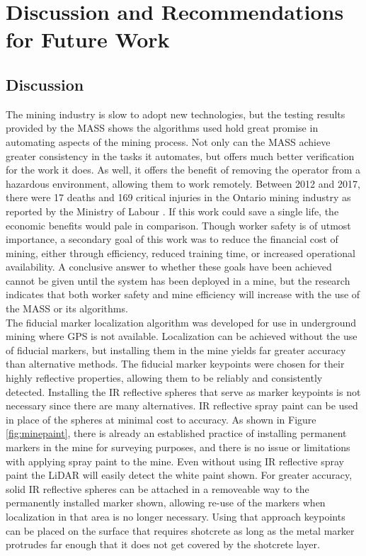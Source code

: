 \chapter{Discussion and Recommendations for Future Work}
\label{chap:conclusions}
\section{Discussion}
The mining industry is slow to adopt new technologies, but the testing results provided by the MASS shows the algorithms used hold great promise in automating aspects of the mining process. Not only can the MASS achieve greater consistency in the tasks it automates, but offers much better verification for the work it does. As well, it offers the benefit of removing the operator from a hazardous environment, allowing them to work remotely. Between 2012 and 2017, there were 17 deaths and 169 critical injuries in the Ontario mining industry as reported by the Ministry of Labour \cite{seebelow}. If this work could save a single life, the economic benefits would pale in comparison. Though worker safety is of utmost importance, a secondary goal of this work was to reduce the financial cost of mining, either through efficiency, reduced training time, or increased operational availability. A conclusive answer to whether these goals have been achieved cannot be given until the system has been deployed in a mine, but the research indicates that both worker safety and mine efficiency will increase with the use of the MASS or its algorithms.\\

The fiducial marker localization algorithm was developed for use in underground mining where GPS is not available. Localization can be achieved without the use of fiducial markers, but installing them in the mine yields far greater accuracy than alternative methods. The fiducial marker keypoints were chosen for their highly reflective properties, allowing them to be reliably and consistently detected. Installing the IR reflective spheres that serve as marker keypoints is not necessary since there are many alternatives. IR reflective spray paint can be used in place of the spheres at minimal cost to accuracy. As shown in Figure \ref{fig:minepaint}, there is already an established practice of installing permanent markers in the mine for surveying purposes, and there is no issue or limitations with applying spray paint to the mine. Even without using IR reflective spray paint the LiDAR will easily detect the white paint shown. For greater accuracy, solid IR reflective spheres can be attached in a removeable way to the permanently installed marker shown, allowing re-use of the markers when localization in that area is no longer necessary. Using that approach keypoints can be placed on the surface that requires shotcrete as long as the metal marker protrudes far enough that it does not get covered by the shotcrete layer.\\

